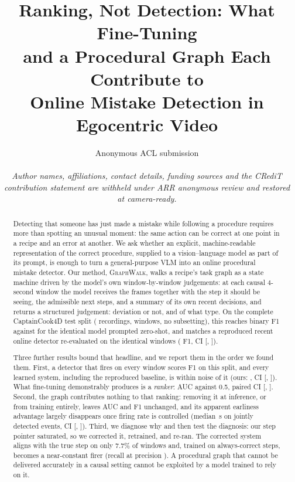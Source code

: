 \documentclass[10pt,twocolumn]{article}
\title{\bf Ranking, Not Detection: What Fine-Tuning\\
and a Procedural Graph Each Contribute to\\
Online Mistake Detection in Egocentric Video}
\author{
Anonymous ACL submission\\[3pt]
\parbox{0.72\textwidth}{\centering\small\itshape Author names, affiliations,
contact details, funding sources and the CRediT contribution statement are
withheld under ARR anonymous review and restored at camera-ready.}
}
\date{}
\newcommand{\ourmodel}{\textsc{GraphWalk}}
\begin{document}
\maketitle

\begin{abstract}
Detecting that someone has just made a mistake while following a procedure
requires more than spotting an unusual moment: the same action can be correct
at one point in a recipe and an error at another. We ask whether an explicit,
machine-readable representation of the correct procedure, supplied to a
vision--language model as part of its prompt, is enough to turn a
general-purpose VLM into an online procedural mistake detector. Our method,
\ourmodel{}, walks a recipe's task graph as a state machine driven by the
model's own window-by-window judgements: at each causal 4-second window the
model receives the frames together with the step it should be seeing, the
admissible next steps, and a summary of its own recent decisions, and returns a
structured judgement: deviation or not, and of what type. On the complete
CaptainCook4D test split (\resClips{} recordings, \resWindows{} windows, no
subsetting), this reaches \resF{} binary F1 against \resZS{} for the identical
model prompted zero-shot, and matches a reproduced recent online detector
re-evaluated on the identical windows (\baseDelta{} F1, CI [\baseDeltaLo{},
\baseDeltaHi{}]).

Three further results bound that headline, and we report them in the order
we found them. First, a detector that fires on every window scores \afF{} F1 on
this split, and every learned system, including the reproduced baseline, is
within noise of it (ours: \afDelta{}, CI [\afDeltaLo{}, \afDeltaHi{}]). What
fine-tuning demonstrably produces is a \emph{ranker}: AUC \resAUC{} against 0.5,
paired CI [\afAucLo{}, \afAucHi{}]. Second, the graph contributes nothing to that
ranking: removing it at inference, or from training entirely, leaves AUC and F1
unchanged, and its apparent earliness advantage largely disappears once firing
rate is controlled (median \moMed{}\,s on jointly detected events, CI
[\moLo{}, \moHi{}]). Third, we diagnose why and then test the diagnosis: our
step pointer saturated, so we corrected it, retrained, and re-ran. The corrected
system aligns with the true step on only 7.7\% of windows and, trained on
always-correct steps, becomes a near-constant firer (recall \fxR{} at precision
\fxP{}). A procedural graph that cannot be delivered accurately in a causal
setting cannot be exploited by a model trained to rely on it.
\end{abstract}
\end{document}
